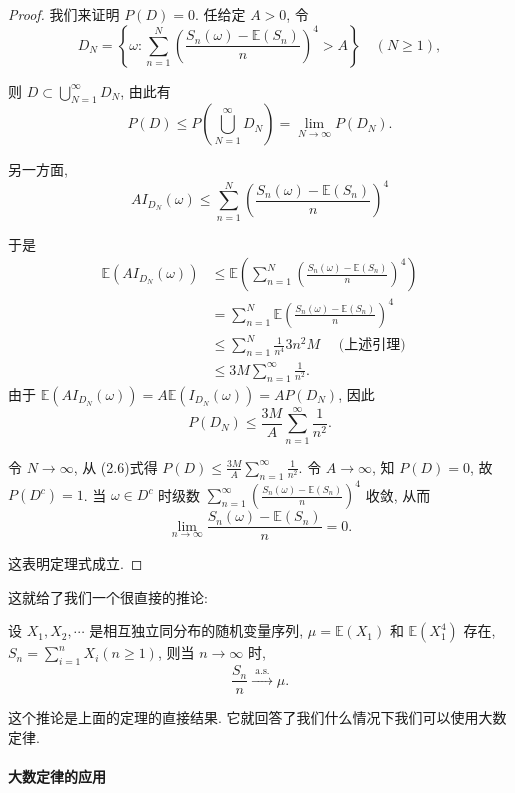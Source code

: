 {\begin{proof}
我们来证明 $P(D)=0$.
任给定 $A>0$, 令
$$
D_N=\left\{\omega: \sum_{n=1}^N\left(\frac{S_n(\omega)-\mathbb{E}\left(S_n\right)}{n}\right)^4>A\right\} \quad(N \geqslant 1),
$$

则 $D \subset \bigcup_{N=1}^{\infty} D_N$, 由此有
$$
P(D) \leq P\left(\bigcup_{N=1}^{\infty} D_N\right)=\lim _{N \rightarrow \infty} P\left(D_N\right) .
$$

另一方面, 
$$
A I_{D_N}(\omega) \leq \sum_{n=1}^N\left(\frac{S_n(\omega)-\mathbb{E}\left(S_n\right)}{n}\right)^4
$$

于是
$$
\begin{aligned}
\mathbb{E}\left(A I_{D_N}(\omega)\right) & \leq \mathbb{E}\left(\sum_{n=1}^N\left(\frac{S_n(\omega)-\mathbb{E}\left(S_n\right)}{n}\right)^4\right) \\
& =\sum_{n=1}^N \mathbb{E}\left(\frac{S_n(\omega)-\mathbb{E}\left(S_n\right)}{n}\right)^4 \\
& \leq \sum_{n=1}^N \frac{1}{n^4} 3 n^2 M \quad\text { (上述引理) } \\
& \leq 3 M \sum_{n=1}^{\infty} \frac{1}{n^2} .
\end{aligned}
$$
由于 $\mathbb{E}\left(A I_{D_N}(\omega)\right)=A \mathbb{E}\left(I_{D_N}(\omega)\right)=A P\left(D_N\right)$, 因此
$$
P\left(D_N\right) \leq \frac{3 M}{A} \sum_{n=1}^{\infty} \frac{1}{n^2} .
$$

令 $N \rightarrow \infty$, 从 (2.6)式得 $P(D) \leq \frac{3 M}{A} \sum_{n=1}^{\infty} \frac{1}{n^2}$. 令 $A \rightarrow \infty$, 知 $P(D)=0$, 故
$P\left(D^c\right)=1$. 当 $\omega \in D^c$ 时级数 $\sum_{n=1}^{\infty}\left(\frac{S_n(\omega)-\mathbb{E}\left(S_n\right)}{n}\right)^4$ 收敛, 从而
$$
\lim _{n \rightarrow \infty} \frac{S_n(\omega)-\mathbb{E}\left(S_n\right)}{n}=0 .
$$

这表明定理式成立.
\end{proof}
}

这就给了我们一个很直接的推论: 
\begin{corollary}
    设 $X_1, X_2, \cdots$ 是相互独立同分布的随机变量序列, $\mu=\mathbb{E}\left(X_1\right)$ 和 $\mathbb{E}\left(X_1^4\right)$ 存在, $S_n=\sum_{i=1}^n X_i(n \geqslant 1)$, 则当 $n \rightarrow \infty$ 时,
$$
\frac{S_n}{n} \stackrel{\text { a.s. }}{\longrightarrow} \mu .
$$
\end{corollary}

这个推论是上面的定理的直接结果. 它就回答了我们什么情况下我们可以使用大数定律. 

\paragraph{大数定律的应用}

